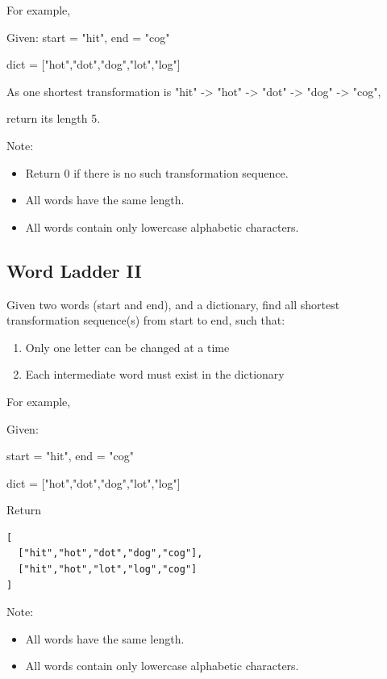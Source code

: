 \documentclass[12pt]{book}
\begin{document}
For example,

Given:
start = "hit", end = "cog"

dict = ["hot","dot","dog","lot","log"]

As one shortest transformation is "hit" -> "hot" -> "dot" -> "dog" -> "cog",

return its length 5.

Note:
\begin{itemize}
\item Return 0 if there is no such transformation sequence.
\item All words have the same length.
\item All words contain only lowercase alphabetic characters.
\end{itemize}

\subsection{Word Ladder II}
\label{sec-18-2-2}
Given two words (start and end), and a dictionary, find all shortest transformation sequence(s) from start to end, such that:
\begin{enumerate}
\item Only one letter can be changed at a time
\item Each intermediate word must exist in the dictionary
\end{enumerate}
For example,

Given:

start = "hit", end = "cog"

dict = ["hot","dot","dog","lot","log"]

Return
\lstset{language=java,label= ,caption= ,numbers=none}
\begin{lstlisting}
[
  ["hit","hot","dot","dog","cog"],
  ["hit","hot","lot","log","cog"]
]
\end{lstlisting}

Note:
\begin{itemize}
\item All words have the same length.
\item All words contain only lowercase alphabetic characters.
\end{itemize}
\end{document}
